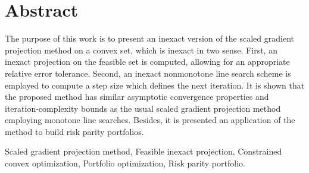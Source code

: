 
\chapter*{Abstract}

The purpose of this work is to present an inexact version of the scaled gradient projection method on a convex set, which is inexact in two sense. First, an inexact projection on the feasible set is computed, allowing for an appropriate relative error tolerance. Second, an inexact nonmonotone line search scheme is employed to compute a step size which defines the next iteration. It is shown that the proposed method has similar asymptotic convergence properties and iteration-complexity bounds as the usual scaled gradient projection method employing monotone line searches. Besides, it is presented an application of the method to build risk parity portfolios.





\medskip\bigskip

 Scaled gradient projection method, Feasible inexact projection,  Constrained convex optimization, Portfolio optimization, Risk parity portfolio.

\newpage
